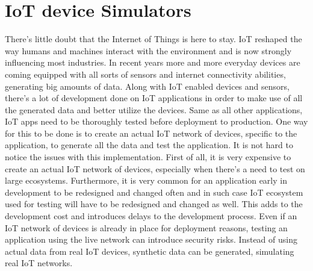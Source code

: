 \section{IoT device Simulators}

There's little doubt that the Internet of Things is here to stay. IoT reshaped the way humans and machines interact with the environment and is now strongly influencing most industries. In recent years more and more everyday devices are coming equipped with all sorts of sensors and internet connectivity abilities, generating big amounts of data. Along with IoT enabled devices and sensors, there's a lot of development done on IoT applications in order to make use of all the generated data and better utilize the devices. Same as all other applications, IoT apps need to be thoroughly tested before deployment to production. One way for this to be done is to create an actual IoT network of devices, specific to the application, to generate all the data and test the application. It is not hard to notice the issues with this implementation. First of all, it is very expensive to create an actual IoT network of devices, especially when there's a need to test on large ecosystems. Furthermore, it is very common for an application early in development to be redesigned and changed often and in such case IoT ecosystem used for testing will have to be redesigned and changed as well. This adds to the development cost and introduces delays to the development process. Even if an IoT network of devices is already in place for deployment reasons, testing an application using the live network can introduce security risks. Instead of using actual data from real IoT devices, synthetic data can be generated, simulating real IoT networks. 



